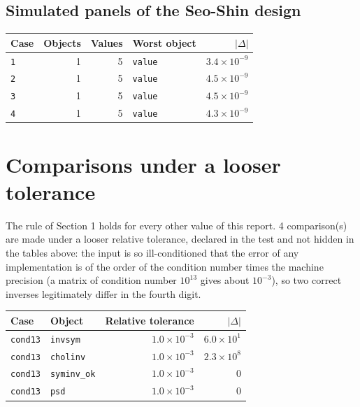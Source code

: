 \documentclass[10.5pt,a4paper]{article}
\begin{document}
\subsection*{Simulated panels of the Seo-Shin design}

\begin{longtable}{@{}p{3.6cm}rrp{4.9cm}r@{}}
\toprule
Case & Objects & Values & Worst object & $|\Delta|$ \\
\midrule
\endhead
\texttt{1} & 1 & 5 & \texttt{value} & $3.4\times10^{-9}$ \\
\texttt{2} & 1 & 5 & \texttt{value} & $4.5\times10^{-9}$ \\
\texttt{3} & 1 & 5 & \texttt{value} & $4.5\times10^{-9}$ \\
\texttt{4} & 1 & 5 & \texttt{value} & $4.3\times10^{-9}$ \\
\bottomrule
\end{longtable}

\section{Comparisons under a looser tolerance}
The rule of Section 1 holds for every other value of this report. 4 comparison(s) are made under a looser relative tolerance, declared in the test and not hidden in the tables above: the input is so ill-conditioned that the error of any implementation is of the order of the condition number times the machine precision (a matrix of condition number $10^{13}$ gives about $10^{-3}$), so two correct inverses legitimately differ in the fourth digit.
\begin{longtable}{@{}p{3cm}p{3cm}rr@{}}
\toprule
Case & Object & Relative tolerance & $|\Delta|$ \\
\midrule
\endhead
\texttt{cond13} & \texttt{invsym} & $1.0\times10^{-3}$ & $6.0\times10^{1}$ \\
\texttt{cond13} & \texttt{cholinv} & $1.0\times10^{-3}$ & $2.3\times10^{8}$ \\
\texttt{cond13} & \texttt{syminv\_\allowbreak{}ok} & $1.0\times10^{-3}$ & 0 \\
\texttt{cond13} & \texttt{psd} & $1.0\times10^{-3}$ & 0 \\
\bottomrule
\end{longtable}
\end{document}

